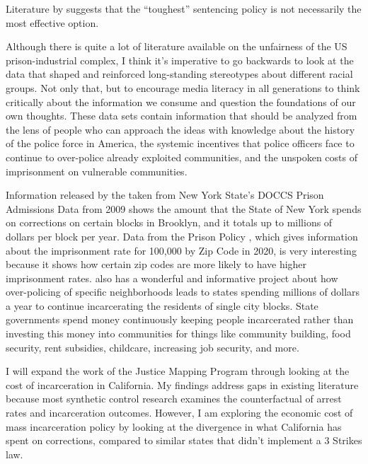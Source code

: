 \documentclass[12pt]{article}
\begin{document}
    Literature by \cite{chen3strikes} suggests that the “toughest” sentencing policy is not necessarily the most effective option.

    Although there is quite a lot of literature available on the unfairness of the US prison-industrial complex, I think it’s imperative to go backwards to look at the data that shaped and reinforced long-standing stereotypes about different racial groups. Not only that, but to encourage media literacy in all generations to think critically about the information we consume and question the foundations of our own thoughts. These data sets contain information that should be analyzed from the lens of people who can approach the ideas with knowledge about the history of the police force in America, the systemic incentives that police officers face to continue to over-police already exploited communities, and the unspoken costs of imprisonment on vulnerable communities. 

    Information released by the \cite{justicemapping2009} taken from New York State’s DOCCS Prison Admissions Data from 2009 shows the amount that the State of New York spends on corrections on certain blocks in Brooklyn, and it totals up to millions of dollars per block per year. Data from the Prison Policy \cite{prisonpolicywages}, which gives information about the imprisonment rate for 100,000 by Zip Code in 2020, is very interesting because it shows how certain zip codes are more likely to have higher imprisonment rates. \cite{csr_mdb} also has a wonderful and informative project about how over-policing of specific neighborhoods leads to states spending millions of dollars a year to continue incarcerating the residents of single city blocks. State governments spend money continuously keeping people incarcerated rather than investing this money into communities for things like community building, food security, rent subsidies, childcare, increasing job security, and more. 

    I will expand the work of the Justice Mapping Program through looking at the cost of incarceration in California. My findings address gaps in existing literature because most synthetic control research examines the counterfactual of arrest rates and incarceration outcomes. However, I am exploring the economic cost of mass incarceration policy by looking at the divergence in what California has spent on corrections, compared to similar states that didn’t implement a 3 Strikes law.
\end{document}
